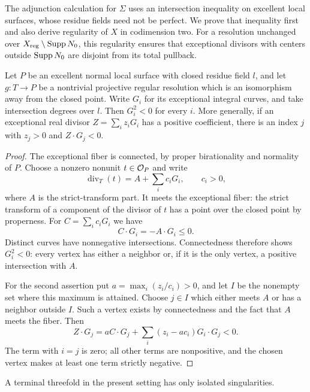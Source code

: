 The adjunction calculation for \(\Sigma\) uses an intersection inequality
on excellent local surfaces, whose residue fields need not be perfect.
We prove that inequality first and also derive regularity of \(X\) in
codimension two.  For a resolution unchanged over
\(X_{\mathrm{reg}}\setminus\operatorname{Supp} N_0\), this regularity ensures that
exceptional divisors with centers outside \(\operatorname{Supp} N_0\) are disjoint
from its total pullback.

\begin{lemma}
\label{lem:exceptional-intersections}
Let \(P\) be an excellent normal local surface with closed residue field
\(l\), and let \(g:T\to P\) be a nontrivial projective regular resolution
which is an isomorphism away from the closed point.  Write \(G_i\) for its
exceptional integral curves, and take intersection degrees over \(l\).
Then \(G_i^2<0\) for every \(i\).  More generally, if an exceptional real
divisor \(Z=\sum_i z_iG_i\) has a positive coefficient, there is an index
\(j\) with \(z_j>0\) and \(Z\cdot G_j<0\).
\end{lemma}

\begin{proof}
The exceptional fiber is connected, by proper birationality and normality
of \(P\).  Choose a nonzero nonunit \(t\in\mathcal O_P\) and write
\[
 \operatorname{div}_T(t)=A+\sum_i c_iG_i,\qquad c_i>0,
\]
where \(A\) is the strict-transform part.  It meets the exceptional fiber:
the strict transform of a component of the divisor of \(t\) has a point
over the closed point by properness.  For \(C=\sum_i c_iG_i\) we have
\[
 C\cdot G_i=-A\cdot G_i\leq0.
\]
Distinct curves have nonnegative intersections.  Connectedness therefore
shows \(G_i^2<0\): every vertex has either a neighbor or, if it is the only
vertex, a positive intersection with \(A\).

For the second assertion put \(a=\max_i(z_i/c_i)>0\), and let \(I\)
be the nonempty set where this maximum is attained.  Choose \(j\in I\)
which either meets \(A\) or has a neighbor outside \(I\).
Such a vertex exists by connectedness and the fact that \(A\) meets the
fiber.  Then
\[
 Z\cdot G_j
 =aC\cdot G_j+\sum_i(z_i-ac_i)G_i\cdot G_j<0.
\]
The term with \(i=j\) is zero; all other terms are nonpositive, and the
chosen vertex makes at least one term strictly negative.
\end{proof}

\begin{lemma}
\label{lem:terminal-codimension-two}
A terminal threefold in the present setting has only isolated
singularities.
\end{lemma}

